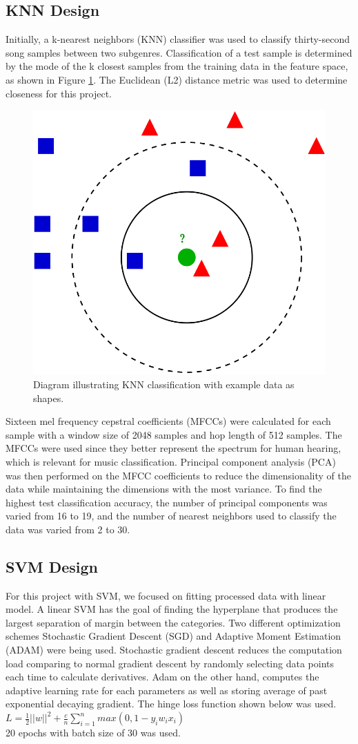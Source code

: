 \documentclass[letterpaper, 12 pt, conference]{ieeeconf}  %
\begin{document}
\subsection{KNN Design}

Initially, a k-nearest neighbors (KNN) classifier was used to classify thirty-second song samples between two subgenres. 
Classification of a test sample is determined by the mode of the k closest samples from the training data in the feature space, as shown in Figure \ref{fig:knnimg}. The Euclidean (L2) distance metric was used to determine closeness for this project.
\begin{figure}[!ht]
  \centering
  \includegraphics[width=.3\textwidth]{knn_graphic.png}
  \caption{Diagram illustrating KNN classification with example data as shapes.}
  \label{fig:knnimg}
\end{figure}

Sixteen mel frequency cepstral coefficients (MFCCs) were calculated for each sample with a window size of 2048 samples and hop length of 512 samples. The MFCCs were used since they better represent the spectrum for human hearing, which is relevant for music classification. Principal component analysis (PCA) was then performed on the MFCC coefficients to reduce the dimensionality of the data while maintaining the dimensions with the most variance. To find the highest test classification accuracy, the number of principal components was varied from 16 to 19, and the number of nearest neighbors used to classify the data was varied from 2 to 30. 

\subsection{SVM Design}
For this project with SVM, we focused on fitting processed data with linear model. A linear SVM has the goal of finding the hyperplane that produces the largest separation of margin between the categories. Two different optimization schemes Stochastic Gradient Descent (SGD) and Adaptive Moment Estimation (ADAM) were being used. Stochastic gradient descent reduces the computation load comparing to normal gradient descent by randomly selecting data points each time to calculate derivatives. Adam on the other hand, computes the adaptive learning rate for each parameters as well as storing average of past exponential decaying gradient. The hinge loss function shown below was used.\\
$L = \frac{1}{2} ||w||^2 + \frac{c}{n}\sum_{i=1}^{n}max(0,1-y_iw_ix_i) $\\
20 epochs with batch size of 30 was used. 
\end{document}
